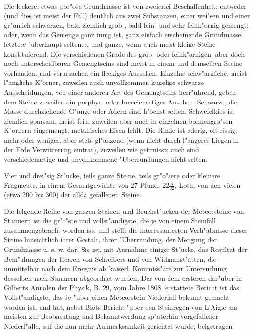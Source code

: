 \documentclass[a4paper, 11pt, oneside, polutonikogreek, german]{article}
\begin{document}
\paragraph{}
Die lockere, etwas por"ose Grundmasse ist von zweierlei Beschaffenheit; entweder (und dies ist meist der Fall) deutlich aus zwei Substanzen, einer wei"sen und einer gr"unlich schwarzen, bald ziemlich grob-, bald fein- und sehr feink"ornig gemengt; oder, wenn das Gemenge ganz innig ist, ganz einfach erscheinende Grundmasse; letztere "uberhaupt seltener, und ganze, wenn auch meist kleine Steine konstituierend. Die verschiedenen Grade des grob- oder feink"ornigen, aber doch noch unterscheidbaren Gemengtseins sind meist in einem und demselben Steine vorhanden, und verursachen ein fleckiges Aussehen. Einzelne schw"arzliche, meist l"angliche K"orner, zuweilen auch unvollkommen kugelige schwarze Ausscheidungen, von einer anderen Art des Gemengtseins herr"uhrend, geben dem Steine zuweilen ein porphyr- oder breccienartiges Ansehen. Schwarze, die Masse durchziehende G"ange oder Adern sind h"ochst selten. Schwefelkies ist ziemlich sparsam, meist fein, zuweilen aber auch in einzelnen bohnengro"sen K"ornern eingemengt; metallisches Eisen fehlt. Die Rinde ist aderig, oft rissig; mehr oder weniger, aber stets gl"anzend (wenn nicht durch l"angeres Liegen in der Erde Verwitterung eintrat), zuweilen wie gefirnisst; auch sind verschiedenartige und unvollkommene "Uberrundungen nicht selten.

Vier und drei"sig St"ucke, teils ganze Steine, teils gr"o"sere oder kleinere Fragmeute, in einem Gesamtgewichte von 27 Pfund, $\mathfrak{22\frac{5}{32}}$, Loth, von den vielen (etwa 200 bis 300) der allda gefallenen Steine.

\setlength{\leftskip}{10mm}
\setlength{\parindent}{0pt}

{\footnotesize Die folgende Reihe von ganzen Steinen und Bruchst"ucken der Meteorsteine von Stannern ist die gr"o"ste und vollst"andigste, die je von einem Steinfall zusammengebracht worden ist, und stellt die interessantesten Verh"altnisse dieser Steine hinsichtlich ihrer Gestalt, ihrer "Uberrundung, der Mengung der Grundmasse u. s. w. dar. Sie ist, mit Ausnahme einiger St"ucke, das Resultat der Bem"uhungen der Herren von Schreibers und von Widmanst"atten, die unmittelbar nach dem Ereignis als kaiserl. Kommiss"are zur Untersuchung desselben nach Stannern abgeordnet wurden, Der von dem ersteren dar"uber in Gilberts Annalen der Physik, B. 29, vom Jahre 1808, erstattete Bericht ist das Vollst"andigste, das Je "uber einen Meteorstein-Niederfall bekannt gemacht worden ist, und hat, nebst Biots Bericht "uber den Steinregen von L’Aigle am meisten zur Beobachtung und Bekanntwerdung sp"aterhin vorgefallener Niederf"alle, auf die nun mehr Aufmerksamkeit gerichtet wurde, beigetragen.}
\end{document}
